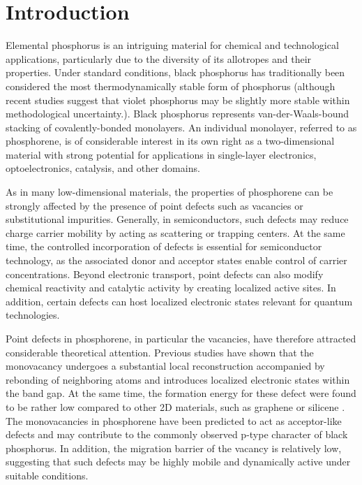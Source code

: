 \documentclass[aip,jcp,reprint]{revtex4-2}
\begin{document}
\section{Introduction}

Elemental phosphorus is an intriguing material for chemical and technological applications, particularly due to the diversity of its allotropes and their properties. Under standard conditions, black phosphorus has traditionally been considered the most thermodynamically stable form of phosphorus\cite{Keyes1953,Cartz1979} (although recent studies suggest that violet phosphorus may be slightly more stable within methodological uncertainty.\cite{Bonometti2025,Vogt2023}).  Black phosphorus represents van-der-Waals-bound stacking of covalently-bonded monolayers.\cite{Morita1986,our_calculation,luke} An individual monolayer, referred to as phosphorene, is of considerable interest in its own right as a two-dimensional material with strong potential for applications in single-layer electronics,\cite{Li2014BPTransistor,Liu2014PhosphoreneTransistor,Zhang2024} optoelectronics,\cite{Xia2014RediscoveringBP,Zhang2024} catalysis, and other domains.\cite{CastellanosGomez2015Review,Tian2023}

As in many low-dimensional materials, the properties of phosphorene can be strongly affected by the presence of point defects such as vacancies or substitutional impurities. Generally, in semiconductors, such defects may reduce charge carrier mobility by acting as scattering or trapping centers.\cite{Shockley1952,Hall1952,Stoneham2001} At the same time, the controlled incorporation of defects is essential for semiconductor technology, as the associated donor and acceptor states enable control of carrier concentrations.\cite{Sze2006,YuCardona2010} Beyond electronic transport, point defects can also modify chemical reactivity and catalytic activity by creating localized active sites.\cite{Freund2011} In addition, certain defects can host localized electronic states relevant for quantum technologies.\cite{Doherty2013,Awschalom2018}

Point defects in phosphorene, in particular the vacancies, have therefore attracted considerable theoretical attention.\cite{Hu2015VacancyBP,Ziletti2015,Carvalho2016Review,Kundu2020NativeDefectsPhosphorene,Srivastava2015VacanciesPhosphorene,Speckmann2024ElectronBeamDefects,ElKhatib2024PhosphoreneMoS2Vacancies,Huang2023VacancyPNR} Previous studies have shown that the monovacancy undergoes a substantial local reconstruction accompanied by rebonding of neighboring atoms\cite{Hu2015MonoDiVacancies,Wang2015NativeDefects} and introduces localized electronic states within the band gap.\cite{Guo2015VacancyStates,Srivastava2015VacanciesAdatoms} At the same time, the formation energy for these defect were found to be rather low compared to other 2D materials, such as graphene or silicene \cite{HuYang2015_JPCCdefects}.
The monovacancies in phosphorene have been predicted to act as acceptor-like defects and may contribute to the commonly observed p-type character of black phosphorus.\cite{Wang2015NativeDefects} In addition, the migration barrier of the vacancy is relatively low, suggesting that such defects may be highly mobile and dynamically active under suitable conditions.\cite{Cai2016VacancyMobility}
\end{document}
